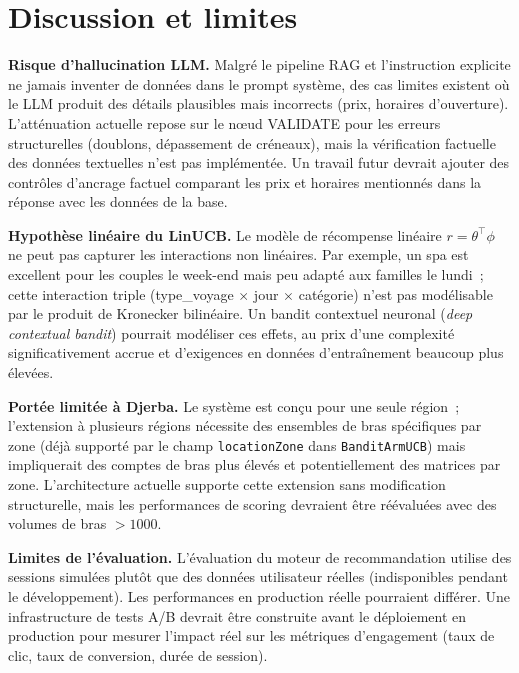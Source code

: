 \section{Discussion et limites}

\textbf{Risque d'hallucination LLM.} Malgré le pipeline RAG et l'instruction explicite
\og{}ne jamais inventer de données\fg{} dans le prompt système, des cas limites existent
où le LLM produit des détails plausibles mais incorrects (prix, horaires d'ouverture).
L'atténuation actuelle repose sur le nœud VALIDATE pour les erreurs structurelles
(doublons, dépassement de créneaux), mais la vérification factuelle des données textuelles
n'est pas implémentée. Un travail futur devrait ajouter des contrôles d'ancrage factuel
comparant les prix et horaires mentionnés dans la réponse avec les données de la base.

\textbf{Hypothèse linéaire du LinUCB.} Le modèle de récompense linéaire
$r = \theta^\top \phi$ ne peut pas capturer les interactions non linéaires. Par exemple,
un spa est excellent pour les couples le week-end mais peu adapté aux familles le lundi~;
cette interaction triple (type\_voyage $\times$ jour $\times$ catégorie) n'est pas
modélisable par le produit de Kronecker bilinéaire. Un bandit contextuel neuronal
(\textit{deep contextual bandit}) pourrait modéliser ces effets, au prix d'une complexité
significativement accrue et d'exigences en données d'entraînement beaucoup plus élevées.

\textbf{Portée limitée à Djerba.} Le système est conçu pour une seule région~; l'extension
à plusieurs régions nécessite des ensembles de bras spécifiques par zone (déjà supporté par
le champ \texttt{locationZone} dans \texttt{BanditArmUCB}) mais impliquerait des comptes
de bras plus élevés et potentiellement des matrices par zone. L'architecture actuelle
supporte cette extension sans modification structurelle, mais les performances de scoring
devraient être réévaluées avec des volumes de bras $> 1000$.

\textbf{Limites de l'évaluation.} L'évaluation du moteur de recommandation utilise des
sessions simulées plutôt que des données utilisateur réelles (indisponibles pendant le
développement). Les performances en production réelle pourraient différer. Une
infrastructure de tests A/B devrait être construite avant le déploiement en production
pour mesurer l'impact réel sur les métriques d'engagement (taux de clic, taux de
conversion, durée de session).

